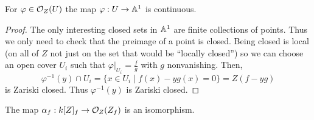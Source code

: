 \documentclass[12pt]{article}
\begin{document}
\begin{prop}
For $\varphi \in \mathcal{O}_{Z}(U)$ the map $\varphi : U \to \mathbb{A}^1$ is continuous.
\end{prop}

\begin{proof}
The only interesting closed sets in $\mathbb{A}^1$ are finite collections of points. Thus we only need to check that the preimage of a point is closed. Being closed is local (on all of $Z$ not just on the set that would be ``locally closed'') so we can choose an open cover $U_i$ such that $\varphi|_{U_i} = \frac{f}{g}$ with $g$ nonvanishing. Then,
\[ \varphi^{-1}(y) \cap U_i = \{ x \in U_i \mid f(x) - y g(x) = 0 \} = Z(f - y g) \]
is Zariski closed. Thus $\varphi^{-1}(y)$ is Zariski closed.
\end{proof}

\begin{prop}
The map $\alpha_f : k[Z]_f \to \mathcal{O}_{Z}(Z_f)$ is an isomorphism. 
\end{prop}
\end{document}
